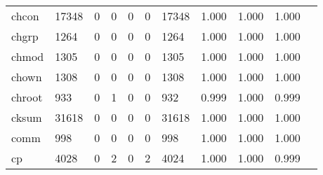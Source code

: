 \begin{longtable}{lp{1.10cm}p{1.10cm}p{1.10cm}p{1.10cm}p{1.10cm}p{1.10cm}p{1.10cm}p{1.10cm}p{1.10cm}p{1.10cm}}
chcon     &                  17348 &                                  0 &                                 0 &                                0 &                                 0 &                           17348 &                             1.000 &                                 1.000 &                               1.000 \\
chgrp     &                   1264 &                                  0 &                                 0 &                                0 &                                 0 &                            1264 &                             1.000 &                                 1.000 &                               1.000 \\
chmod     &                   1305 &                                  0 &                                 0 &                                0 &                                 0 &                            1305 &                             1.000 &                                 1.000 &                               1.000 \\
chown     &                   1308 &                                  0 &                                 0 &                                0 &                                 0 &                            1308 &                             1.000 &                                 1.000 &                               1.000 \\
chroot    &                    933 &                                  0 &                                 1 &                                0 &                                 0 &                             932 &                             0.999 &                                 1.000 &                               0.999 \\
cksum     &                  31618 &                                  0 &                                 0 &                                0 &                                 0 &                           31618 &                             1.000 &                                 1.000 &                               1.000 \\
comm      &                    998 &                                  0 &                                 0 &                                0 &                                 0 &                             998 &                             1.000 &                                 1.000 &                               1.000 \\
cp        &                   4028 &                                  0 &                                 2 &                                0 &                                 2 &                            4024 &                             1.000 &                                 1.000 &                               0.999 \\

\end{longtable}
